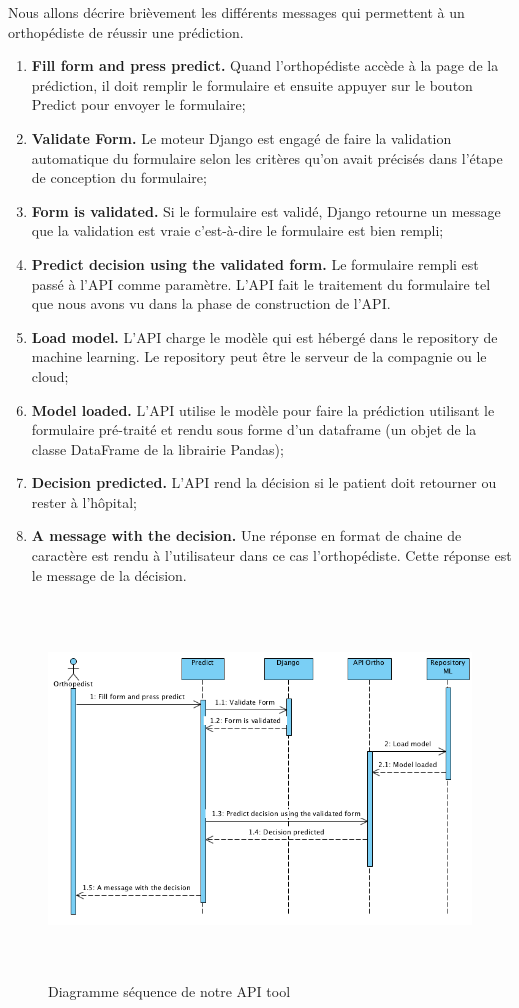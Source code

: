 \documentclass[12pt, french]{report}
\begin{document}
Nous allons décrire brièvement les différents messages qui permettent à un orthopédiste de réussir une prédiction.
\begin{enumerate}
\item \textbf{Fill form and press predict.} Quand l'orthopédiste accède à la page de la prédiction, il doit remplir le formulaire et ensuite appuyer sur le bouton Predict pour envoyer le formulaire;
\item \textbf{Validate Form.} Le moteur Django est engagé de faire la validation automatique du formulaire selon les critères qu'on avait précisés dans l'étape de conception du formulaire;
\item \textbf{Form is validated.} Si le formulaire est validé, Django retourne un message que la validation est vraie c'est-à-dire le formulaire est bien rempli;
\item \textbf{Predict decision using the validated form.} Le formulaire rempli est passé à l'API comme paramètre. L'API fait le traitement du formulaire tel que nous avons vu dans la phase de construction de l'API.
\item \textbf{Load model.} L'API charge le modèle qui est hébergé dans le repository de machine learning. Le repository peut être le serveur de la compagnie ou le cloud;
\item \textbf{Model loaded.} L'API utilise le modèle pour faire la prédiction utilisant le formulaire pré-traité et rendu sous forme d'un dataframe (un objet de la classe DataFrame de la librairie Pandas);
\item \textbf{Decision predicted.} L'API rend la décision si le patient doit retourner ou rester à l'hôpital;
\item \textbf{A message with the decision.} Une réponse en format de chaine de caractère est rendu à l'utilisateur dans ce cas l'orthopédiste. Cette réponse est le message de la décision.
\end{enumerate}


 
\begin{figure}[p]
	\includegraphics[width=17cm, height=10cm ]{images/SequenceDiag.png}
	\caption{Diagramme séquence de notre API tool}
	\label{SequenceDiag}
\end{figure} 
\end{document}

